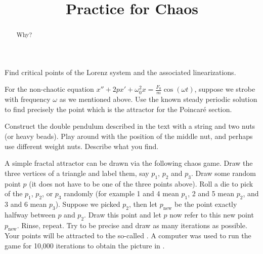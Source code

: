 \documentclass{ximera}
\title{Practice for Chaos}
\begin{document}
\begin{abstract}
Why?
\end{abstract}
\maketitle


\begin{exercise}%
    Find critical points of the Lorenz system and the associated linearizations.
\end{exercise}

\begin{exercise}
    For the non-chaotic equation $x''+2p x' + \omega_0^2 x = \frac{F_0}{m} \cos (\omega t)$, suppose we strobe with frequency $\omega$ as we mentioned above.  Use the known steady periodic solution to find precisely the point which is the attractor for the Poincar\'e section.
\end{exercise}

\begin{exercise}%
    Construct the double pendulum described in the text with a string and two nuts (or heavy beads).  Play around with the position of the middle nut, and perhaps use different weight nuts.  Describe what you find.
\end{exercise}


\begin{exercise}%
    A simple fractal attractor can be drawn via the following chaos game.  Draw the three vertices of a triangle and label them, say $p_1$, $p_2$ and $p_3$.  Draw some random point $p$ (it does not have to be one of the three points above). Roll a die to pick of the $p_1$, $p_2$, or $p_3$ randomly (for example 1 and 4 mean $p_1$, 2 and 5 mean $p_2$, and 3 and 6 mean $p_3$).  Suppose we picked $p_2$, then let $p_{\text{new}}$ be the point exactly halfway between $p$ and $p_2$.  Draw this point and let $p$ now refer to this new point $p_{\text{new}}$.  Rinse, repeat.  Try to be precise and draw as many iterations as possible.  Your points will be attracted to the so-called \emph{}.  A computer was used to run the game for 10,000 iterations to obtain the picture in .
\end{exercise}
\end{document}
